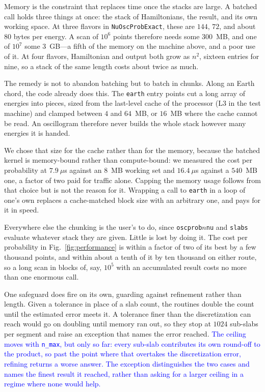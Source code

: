 \documentclass[final,5p,times,twocolumn,sort,compress]{elsarticle}
\newcommand{\fig}{Fig.}
\newcommand{\figu}[1]{\fig~\ref{fig:#1}}
\begin{document}
Memory is the constraint that replaces time once the stacks are large.  A batched call holds three things at once: the stack of Hamiltonians, the result, and its own working space.  At three flavors in {\tt NuOscProbExact}, these are $144$, $72$, and about $80$ bytes per energy.  A scan of $10^6$ points therefore needs some $300$~MB, and one of $10^7$ some $3$~GB---a fifth of the memory on the machine above, and a poor use of it.  At four flavors, Hamiltonian and output both grow as $n^2$, sixteen entries for nine, so a stack of the same length costs about twice as much.  

The remedy is not to abandon batching but to batch in chunks.  Along an Earth chord, the code already does this.  The {\tt earth} entry points cut a long array of energies into pieces, sized from the last-level cache of the processor (L3 in the test machine) and clamped between $4$ and $64$~MB, or $16$~MB where the cache cannot be read.  An oscillogram therefore never builds the whole stack however many energies it is handed.

We chose that size for the cache rather than for the memory, because the batched kernel is memory-bound rather than compute-bound: we measured the cost per probability at $7.9~\mu$s against an $8$~MB working set and $16.4~\mu$s against a $540$~MB one, a factor of two paid for traffic alone.  Capping the memory usage follows from that choice but is not the reason for it.  Wrapping a call to {\tt earth} in a loop of one's own replaces a cache-matched block size with an arbitrary one, and pays for it in speed.

Everywhere else the chunking is the user's to do, since {\tt oscprob$n$nu} and {\tt slabs} evaluate whatever stack they are given.  Little is lost by doing it.  The cost per probability in \figu{performance} is within a factor of two of its best by a few thousand points, and within about a tenth of it by ten thousand on either route, so a long scan in blocks of, say, $10^5$ with an accumulated result costs no more than one enormous call.

One safeguard does fire on its own, guarding against refinement rather than length.  Given a tolerance in place of a slab count, the routines double the count until the estimated error meets it.  A tolerance finer than the discretization can reach would go on doubling until memory ran out, so they stop at $1024$ sub-slabs per segment and raise an exception that names the error reached.  \textcolor{blue}{The ceiling moves with {\tt n\_max}, but only so far: every sub-slab contributes its own round-off to the product, so past the point where that overtakes the discretization error, refining returns a worse answer.  The exception distinguishes the two cases and names the finest result it reached, rather than asking for a larger ceiling in a regime where none would help.}
\end{document}
